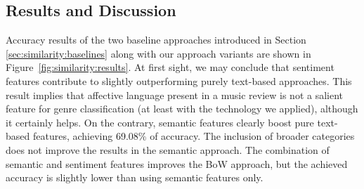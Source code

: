 

\subsection{Results and Discussion}

Accuracy results of the two baseline approaches introduced in Section \ref{sec:similarity:baselines} along with our approach variants are shown in Figure~\ref{fig:similarity:results}. At first sight, we may conclude that sentiment features contribute to slightly outperforming purely text-based approaches. This result implies that affective language present in a music review is not a salient feature for genre classification (at least with the technology we applied), although it certainly helps. On the contrary, semantic features clearly boost pure text-based features, achieving 69.08\% of accuracy. The inclusion of broader categories does not improve the results in the semantic approach. The combination of semantic and sentiment features improves the BoW approach, but the achieved accuracy is slightly lower than using semantic features only.%

